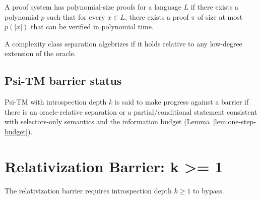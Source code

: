 \begin{definition}
A proof system has polynomial-size proofs for a language $L$ if there exists a polynomial $p$ such that for every $x \in L$, there exists a proof $\pi$ of size at most $p(|x|)$ that can be verified in polynomial time.
\end{definition}

\begin{definition}
A complexity class separation algebrizes if it holds relative to any low-degree extension of the oracle.
\end{definition}

\subsection{Psi-TM barrier status}

\begin{definition}
Psi-TM with introspection depth $k$ is said to make progress against a barrier if there is an oracle-relative separation or a partial/conditional statement consistent with selectors-only semantics and the information budget (Lemma~\ref{lem:one-step-budget}).
\end{definition}

\section{Relativization Barrier: k >= 1}

\begin{theorem}
The relativization barrier requires introspection depth $k \geq 1$ to bypass.
\end{theorem}


